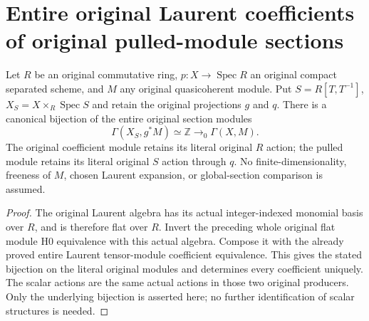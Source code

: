\section{Entire original Laurent coefficients of original pulled-module sections}

\begin{theorem}\label{thm:fc-scheme-module-laurent-coefficients}
\leanok
{}
Let $R$ be an original commutative ring, $p:X\to\operatorname{Spec}R$
an original compact separated scheme, and $M$ any original
quasicoherent module. Put $S=R[T,T^{-1}]$, $X_S=X\times_R\operatorname{Spec}S$
and retain the original projections $g$ and $q$. There is a canonical
bijection of the entire original section modules
\[
 \Gamma(X_S,g^*M)\simeq\mathbb Z\to_0\Gamma(X,M).
\]
The original coefficient module retains its literal original $R$ action;
the pulled module retains its literal original $S$ action through $q$.
No finite-dimensionality, freeness of $M$, chosen Laurent expansion,
or global-section comparison is assumed.
\end{theorem}
\begin{proof}
The original Laurent algebra has its actual integer-indexed monomial
basis over $R$, and is therefore flat over $R$. Invert the preceding
whole original flat module H0 equivalence with this actual algebra.
Compose it with the already proved entire Laurent tensor-module
coefficient equivalence. This gives the stated bijection on the
literal original modules and determines every coefficient uniquely.
The scalar actions are the same actual actions in those two original
producers. Only the underlying bijection is asserted here; no further
identification of scalar structures is needed.
\end{proof}

